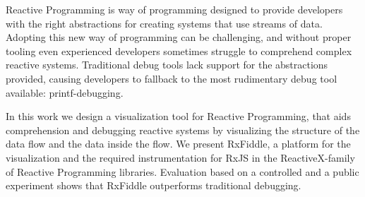 Reactive Programming is way of programming designed to provide developers with the right abstractions for creating systems that use streams of data.
Adopting this new way of programming can be challenging, and without proper tooling even experienced developers sometimes struggle to comprehend complex reactive systems.
Traditional debug tools lack support for the abstractions provided, causing developers to fallback to the most rudimentary debug tool available: printf-debugging.

In this work we design a visualization tool for Reactive Programming, that aids comprehension and debugging reactive systems by visualizing the structure of the data flow and the data inside the flow.
We present RxFiddle, a platform for the visualization and the required instrumentation for RxJS in the ReactiveX-family of Reactive Programming libraries.
Evaluation based on a controlled and a public experiment shows that RxFiddle outperforms traditional debugging.
